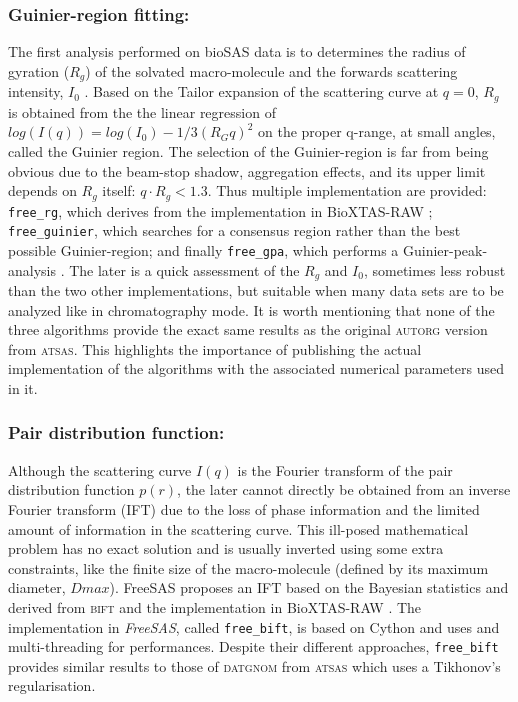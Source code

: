 \documentclass[preprint]{iucr}              %
\begin{document}
\subsubsection{Guinier-region fitting:}
The first analysis performed on bioSAS data is to determines the radius of gyration ($R_g$) of the solvated macro-molecule and the forwards scattering intensity, $I_0$ \cite{guinier}.
Based on the Tailor expansion of the scattering curve at $q=0$, $R_g$ is obtained from the the linear regression of $log(I(q)) = log(I_0)-1/3 (R_{G}q)^{2}$ on the proper q-range, at small angles, called the Guinier region.
The selection of the Guinier-region is far from being obvious due to the beam-stop shadow, aggregation effects, and its upper limit depends on $R_g$ itself: $q \cdot R_g<1.3$.
Thus multiple implementation are provided: \texttt{free\_rg}, which derives from the implementation in BioXTAS-RAW \cite{bioxtasraw}; \texttt{free\_guinier}, which searches for a consensus region rather than the best possible Guinier-region; and finally \texttt{free\_gpa}, which performs a Guinier-peak-analysis \cite{gpa}. 
The later is a quick assessment of the $R_g$ and $I_0$, sometimes less robust than the two other implementations, but suitable when many data sets are to be analyzed like in chromatography mode.
It is worth mentioning that none of the three algorithms provide the exact same results as the original \textsc{autorg} \cite{ATSAS2} version from \textsc{atsas}. 
This highlights the importance of publishing the actual implementation of the algorithms with the associated numerical parameters used in it.
  
\subsubsection{Pair distribution function:}
Although the scattering curve $I(q)$ is the Fourier transform of the pair distribution function $p(r)$, the later cannot directly be obtained from an inverse Fourier transform (IFT) due to the loss of phase information and the limited amount of information in the scattering curve. 
This ill-posed mathematical problem has no exact solution and is usually inverted using some extra constraints, like the finite size of the macro-molecule (defined by its maximum diameter, $Dmax$).    
FreeSAS proposes an IFT based on the Bayesian statistics and derived from \textsc{bift} \cite{bift} and the implementation in BioXTAS-RAW \cite{BioXTAS}.
The implementation in \textit{FreeSAS}, called \texttt{free\_bift}, is based on Cython \cite{cython} and uses  \cite{blas} and multi-threading for performances.
Despite their different approaches, \texttt{free\_bift} provides similar results to those of \textsc{datgnom} \cite{ATSAS1} from \textsc{atsas} which uses a Tikhonov's regularisation.
\end{document}
